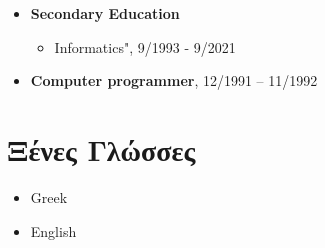 \documentclass[%
    11pt,
  oneside
  ]{memoir}
\let\oldsection\section
\renewcommand{\section}[1]{%
  \oldsection{#1}
  \leavevmode
  \par
  \vspace{\dimexpr-\baselineskip-\parskip}
}
\begin{document}
\begin{itemize}
\tightlist
\item
  \textbf{Secondary Education}

  \begin{itemize}
  \tightlist
  \item
    Informatics", 9/1993 - 9/2021
  \end{itemize}
\item
  \textbf{Computer programmer}, 12/1991 -- 11/1992
\end{itemize}

\hypertarget{ux3beux3adux3bdux3b5ux3c2-ux3b3ux3bbux3ceux3c3ux3c3ux3b5ux3c2}{%
\section{Ξένες
Γλώσσες}\label{ux3beux3adux3bdux3b5ux3c2-ux3b3ux3bbux3ceux3c3ux3c3ux3b5ux3c2}}

\begin{itemize}
\tightlist
\item
  Greek
\item
  English
\end{itemize}
\end{document}
